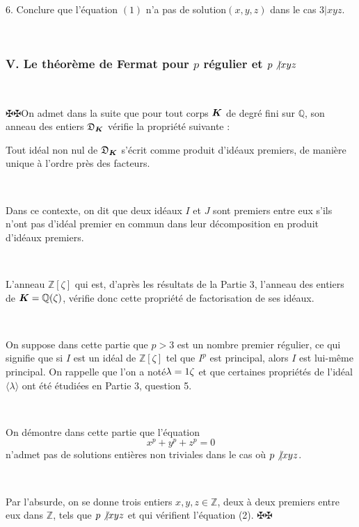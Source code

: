 \

6. Conclure que l'{\'e}quation $(1)$ n'a pas de solution$(x, y, z)$ dans le
cas $3 | x y z$.

\

\subsubsection*{V. Le th{\'e}or{\`e}me de Fermat pour $p$ r{\'e}gulier et $p
\not{| \nobracket} x y z$}

\

$\maltese \maltese$\quad On admet dans la suite que pour tout corps
$\tmmathbf{K}$ de degr{\'e} fini sur $\mathbb{Q}$, son anneau des entiers
$\mathfrak{D}_{\tmmathbf{K}}$ v{\'e}rifie la propri{\'e}t{\'e} suivante :

Tout id{\'e}al non nul de $\mathfrak{D}_{\tmmathbf{K}}$ s'{\'e}crit comme
produit d'id{\'e}aux premiers, de mani{\`e}re unique {\`a} l'ordre pr{\`e}s
des facteurs.

\

Dans ce contexte, on dit que deux id{\'e}aux $I$ et $J$ sont premiers entre
eux s'ils n'ont pas d'id{\'e}al premier en commun dans leur d{\'e}composition
en produit d'id{\'e}aux premiers.

\

L'anneau $\mathbb{Z}[\zeta]$ qui est, d'apr{\`e}s les r{\'e}sultats de la
Partie 3, l'anneau des entiers de $\tmmathbf{K} =\mathbb{Q}(\zeta)$,
v{\'e}rifie donc cette propri{\'e}t{\'e} de factorisation de ses id{\'e}aux.

\

On suppose dans cette partie que $p > 3$ est un nombre premier r{\'e}gulier,
ce qui signifie que si $I$ est un id{\'e}al de $\mathbb{Z}[\zeta]$ tel que
$I^p$ est principal, alors $I$ est lui-m{\^e}me principal. On rappelle que
l'on a not{\'e}$\lambda = 1 \nonconverted{minus} \zeta$ et que certaines
propri{\'e}t{\'e}s de l'id{\'e}al $\langle \lambda \rangle$ ont {\'e}t{\'e}
{\'e}tudi{\'e}es en Partie $3$, question 5.

\

On d{\'e}montre dans cette partie que l'{\'e}quation
\begin{equation}
  x^p + y^p + z^p = 0
\end{equation}
n'admet pas de solutions enti{\`e}res non triviales dans le cas o{\`u} $p
\not{| \nobracket} x y z$.

\

Par l'absurde, on se donne trois entiers $x, y, z \in \mathbb{Z}$, deux {\`a}
deux premiers entre eux dans $\mathbb{Z}$, tels que $p \not{| \nobracket} x y
z$ et qui v{\'e}rifient l'{\'e}quation (2). $\maltese \maltese$

